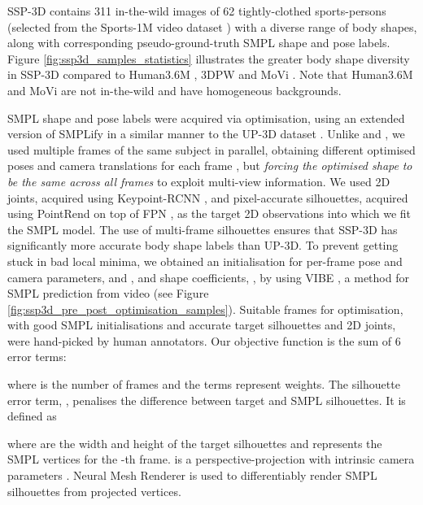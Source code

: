 \documentclass{bmvc2k}
\begin{document}
SSP-3D contains 311 in-the-wild images of 62 tightly-clothed sports-persons (selected from the Sports-1M video dataset \cite{KarpathyCVPR14}) with a diverse range of body shapes, along with corresponding pseudo-ground-truth SMPL shape and pose labels. Figure \ref{fig:ssp3d_samples_statistics} illustrates the greater body shape diversity in SSP-3D compared to Human3.6M \cite{h36m_pami}, 3DPW \cite{vonMarcard2018} and MoVi \cite{movi2020}. Note that Human3.6M and MoVi are not in-the-wild and have homogeneous backgrounds.

SMPL shape and pose labels were acquired via optimisation, using an extended version of SMPLify \cite{Bogo:ECCV:2016} in a similar manner to the UP-3D dataset \cite{Lassner:UP:2017}. Unlike \cite{Bogo:ECCV:2016} and \cite{Lassner:UP:2017}, we used multiple frames of the same subject in parallel, obtaining different optimised poses  and camera translations  for each frame , but \textit{forcing the optimised shape}  \textit{to be the same across all frames} to exploit multi-view information. We used 2D joints, acquired using Keypoint-RCNN \cite{he2017maskrcnn}, and pixel-accurate silhouettes, acquired using PointRend \cite{kirillov2019pointrend} on top of FPN \cite{lin2016fpn}, as the target 2D observations into which we fit the SMPL model. The use of multi-frame silhouettes ensures that SSP-3D has significantly more accurate body shape labels than UP-3D. To prevent getting stuck in bad local minima, we obtained an initialisation for per-frame pose and camera parameters,  and , and shape coefficients, , by using VIBE \cite{kocabas2019vibe}, a method for SMPL prediction from video (see Figure \ref{fig:ssp3d_pre_post_optimisation_samples}). Suitable frames for optimisation, with good SMPL initialisations and accurate target silhouettes and 2D joints, were hand-picked by human annotators. Our objective function is the sum of 6 error terms:
\vspace{-0.25cm}

where  is the number of frames and the  terms represent weights. The silhouette error term, , penalises the  difference between target and SMPL silhouettes. It is defined as
\vspace{-0.25cm}

where  are the width and height of the target silhouettes  and  represents the SMPL vertices for the -th frame.  is a perspective-projection with intrinsic camera parameters . Neural Mesh Renderer \cite{kato2018renderer} is used to differentiably render SMPL silhouettes  from projected vertices.
\end{document}
